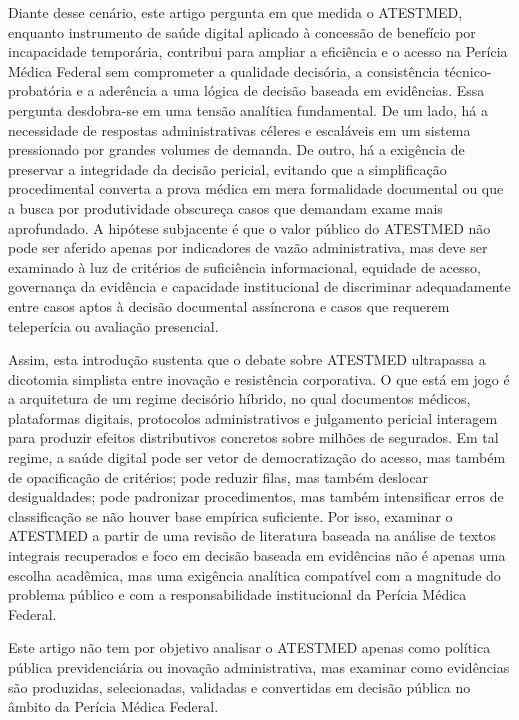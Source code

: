 \documentclass[12pt,a4paper]{article}
\begin{document}
Diante desse cenário, este artigo pergunta em que medida o ATESTMED, enquanto instrumento de saúde digital aplicado à concessão de benefício por incapacidade temporária, contribui para ampliar a eficiência e o acesso na Perícia Médica Federal sem comprometer a qualidade decisória, a consistência técnico-probatória e a aderência a uma lógica de decisão baseada em evidências. Essa pergunta desdobra-se em uma tensão analítica fundamental. De um lado, há a necessidade de respostas administrativas céleres e escaláveis em um sistema pressionado por grandes volumes de demanda. De outro, há a exigência de preservar a integridade da decisão pericial, evitando que a simplificação procedimental converta a prova médica em mera formalidade documental ou que a busca por produtividade obscureça casos que demandam exame mais aprofundado. A hipótese subjacente é que o valor público do ATESTMED não pode ser aferido apenas por indicadores de vazão administrativa, mas deve ser examinado à luz de critérios de suficiência informacional, equidade de acesso, governança da evidência e capacidade institucional de discriminar adequadamente entre casos aptos à decisão documental assíncrona e casos que requerem teleperícia ou avaliação presencial.

Assim, esta introdução sustenta que o debate sobre ATESTMED ultrapassa a dicotomia simplista entre inovação e resistência corporativa. O que está em jogo é a arquitetura de um regime decisório híbrido, no qual documentos médicos, plataformas digitais, protocolos administrativos e julgamento pericial interagem para produzir efeitos distributivos concretos sobre milhões de segurados. Em tal regime, a saúde digital pode ser vetor de democratização do acesso, mas também de opacificação de critérios; pode reduzir filas, mas também deslocar desigualdades; pode padronizar procedimentos, mas também intensificar erros de classificação se não houver base empírica suficiente. Por isso, examinar o ATESTMED a partir de uma revisão de literatura baseada na análise de textos integrais recuperados e foco em decisão baseada em evidências não é apenas uma escolha acadêmica, mas uma exigência analítica compatível com a magnitude do problema público e com a responsabilidade institucional da Perícia Médica Federal.

Este artigo não tem por objetivo analisar o ATESTMED apenas como política pública previdenciária ou inovação administrativa, mas examinar como evidências são produzidas, selecionadas, validadas e convertidas em decisão pública no âmbito da Perícia Médica Federal.
\end{document}
